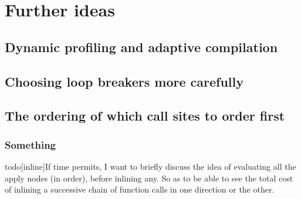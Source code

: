 
\clearpage
\section{Further ideas}

\subsection{Dynamic profiling and adaptive compilation}

\subsection{Choosing loop breakers more carefully}

\subsection{The ordering of which call sites to order first}

\subsubsection{Something} todo[inline]{If time permits, I want to briefly
discuss the idea of evaluating all the apply nodes (in order), before inlining
any. So as to be able to see the total cost of inlining a successive chain of
function calls in one direction or the other.}
